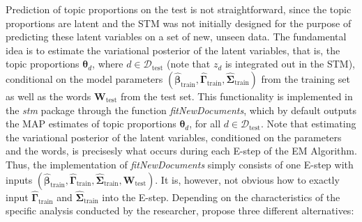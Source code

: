 Prediction of topic proportions on the test is not straightforward, since the topic proportions are latent and the STM was not initially designed for the purpose of predicting these latent variables on a set of new, unseen data. The fundamental idea is to estimate the variational posterior of the latent variables, that is, the topic proportions $\boldsymbol{\theta}_d$, where $d \in \mathcal{D}_{\text{test}}$ (note that $z_d$ is integrated out in the STM), conditional on the model parameters $(\hat{\boldsymbol{\beta}}_{\text{train}}, \hat{\boldsymbol{\Gamma}}_{\text{train}}, \hat{\boldsymbol{\Sigma}}_{\text{train}})$ from the training set as well as the words $\boldsymbol{W}_{\text{test}}$ from the test set. This functionality is implemented in the \textit{stm} package through the function \textit{fitNewDocuments}, which by default outputs the MAP estimates of topic proportions $\boldsymbol{\theta}_d$, for all $d \in \mathcal{D}_{\text{test}}$. Note that estimating the variational posterior of the latent variables, conditioned on the parameters and the words, is precisesly what occurs during each E-step of the EM Algorithm. Thus, the implementation of \textit{fitNewDocuments} simply consists of one E-step with inputs $(\hat{\boldsymbol{\beta}}_{\text{train}}, \hat{\boldsymbol{\Gamma}}_{\text{train}}, \hat{\boldsymbol{\Sigma}}_{\text{train}}, \boldsymbol{W}_{\text{test}})$. It is, however, not obvious how to exactly input $\hat{\boldsymbol{\Gamma}}_{\text{train}}$ and  $\hat{\boldsymbol{\Sigma}}_{\text{train}}$ into the E-step. Depending on the characteristics of the specific analysis conducted by the researcher, \cite{egami2018make} propose three different alternatives:
